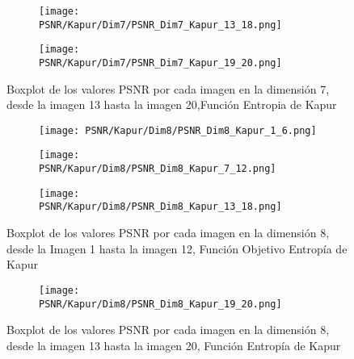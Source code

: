 \documentclass[conference]{IEEEtran}
\begin{document}
\begin{figure}[htbp]
	\centering
	\begin{subfigure}{0.5\textwidth}
		\texttt{[image: PSNR/Kapur/Dim7/PSNR\_Dim7\_Kapur\_13\_18.png]}
	\end{subfigure}   
	\begin{subfigure}{0.5\textwidth}
		\texttt{[image: PSNR/Kapur/Dim7/PSNR\_Dim7\_Kapur\_19\_20.png]}
		\vspace{-150pt} %
	\end{subfigure}
	\caption{Boxplot de los valores PSNR por cada imagen en la dimensión 7, desde la imagen 13 hasta la imagen 20,Función Entropia de Kapur}
	\label{fig:imagenes}    
\end{figure}

\begin{figure}[htbp] %
	\centering %
	\begin{subfigure}{0.5\textwidth}
		\centering %
		\texttt{[image: PSNR/Kapur/Dim8/PSNR\_Dim8\_Kapur\_1\_6.png]}
	\end{subfigure}%
	\begin{subfigure}{0.5\textwidth}
		\centering
		\texttt{[image: PSNR/Kapur/Dim8/PSNR\_Dim8\_Kapur\_7\_12.png]}
	\end{subfigure}
		\begin{subfigure}{0.5\textwidth}
		\centering
		\texttt{[image: PSNR/Kapur/Dim8/PSNR\_Dim8\_Kapur\_13\_18.png]}
	\end{subfigure}%
	\caption{Boxplot de los valores PSNR por cada imagen en la dimensión 8, desde la Imagen 1 hasta la imagen 12, Función Objetivo Entropía de Kapur}
	\label{fig:imagenes_dim8_1_12}    
\end{figure}

\begin{figure}[htbp]
	\centering

	\begin{subfigure}{0.5\textwidth}
		\centering
		\texttt{[image: PSNR/Kapur/Dim8/PSNR\_Dim8\_Kapur\_19\_20.png]}
	\end{subfigure}
	\caption{Boxplot de los valores PSNR por cada imagen en la dimensión 8, desde la imagen 13 hasta la imagen 20, Función Entropía de Kapur}
	\label{fig:imagenes_dim8_13_20}    
\end{figure}
\end{document}
